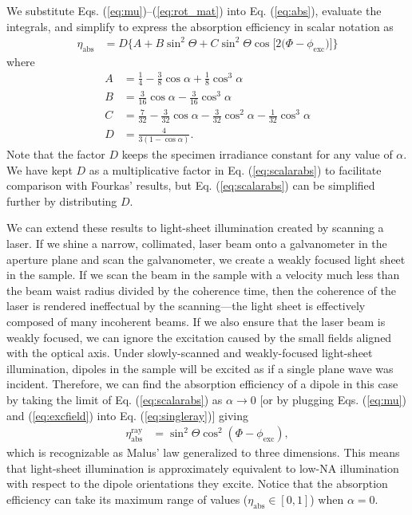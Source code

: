 \documentclass[10pt]{article}
\begin{document}
We substitute {\color{urlblue}Eqs.} (\ref{eq:mu})--(\ref{eq:rot_mat}) into
{\color{urlblue}Eq.} (\ref{eq:abs}), evaluate the integrals, and simplify to
express the absorption efficiency in scalar notation as
\begin{align}
  \eta_{\text{abs}} &= D\{A + B\sin^{2}{\Theta} + C\sin^{2}{\Theta} \cos{[2 (\Phi - \phi_{\text{exc}}})]\}\label{eq:scalarabs}
\end{align}
where
\begin{subequations}
\begin{align}
  A &= \frac{1}{4} - \frac{3}{8} \cos{\alpha } + \frac{1}{8} \cos^{3}{\alpha }\\
  B &= \frac{3}{16} \cos{\alpha } - \frac{3}{16} \cos^{3}{\alpha }\\
  C &= \frac{7}{32} - \frac{3}{32} \cos{\alpha } - \frac{3}{32} \cos^{2}{\alpha } - \frac{1}{32} \cos^{3}{\alpha}\\
  D &= \frac{4}{3(1 - \cos\alpha)}.
\end{align}\label{eq:coefficients}%
\end{subequations}
Note that the factor $D$ keeps the specimen irradiance constant for any value of
$\alpha$. \hypertarget{dfactor}{{\color{urlblue} We have kept $D$ as a
    multiplicative factor in Eq. (\ref{eq:scalarabs}) to facilitate comparison
    with Fourkas' results, but Eq. (\ref{eq:scalarabs}) can be simplified
    further by distributing $D$.}}

We can extend these results to light-sheet illumination created by scanning a
laser. If we shine a narrow, collimated, laser beam onto a galvanometer in the
aperture plane and scan the galvanometer, we create a weakly focused light sheet
in the sample. If we scan the beam in the sample with a velocity much less than
the beam waist radius divided by the coherence time, then the coherence of the
laser is rendered ineffectual by the scanning---the light sheet is effectively
composed of many incoherent beams. If we also ensure that the laser beam is
weakly focused, we can ignore the excitation caused by the small fields aligned
with the optical axis. Under slowly-scanned and weakly-focused light-sheet
illumination, dipoles in the sample will be excited as if a single plane wave
was incident. Therefore, we can find the absorption efficiency of a dipole in
this case by taking the limit of {\color{urlblue}Eq.} (\ref{eq:scalarabs}) as
$\alpha \rightarrow 0$ {\color{urlblue}[}or by plugging {\color{urlblue}Eqs.}
(\ref{eq:mu}) and (\ref{eq:excfield}) into {\color{urlblue}Eq.}
(\ref{eq:singleray}){\color{urlblue}]} giving
\begin{align}
  \eta_{\text{abs}}^{\text{ray}} &= \sin^2\Theta\cos^2(\Phi - \phi_{\text{exc}}),
\end{align}
which is recognizable as Malus' law generalized to three dimensions. This means
that light-sheet illumination is approximately equivalent to low-NA illumination
with respect to the dipole orientations they excite. Notice that the
absorption efficiency can take its maximum range of values
($\eta_{\text{abs}} \in [0, 1]$) when $\alpha=0$.
\end{document}
